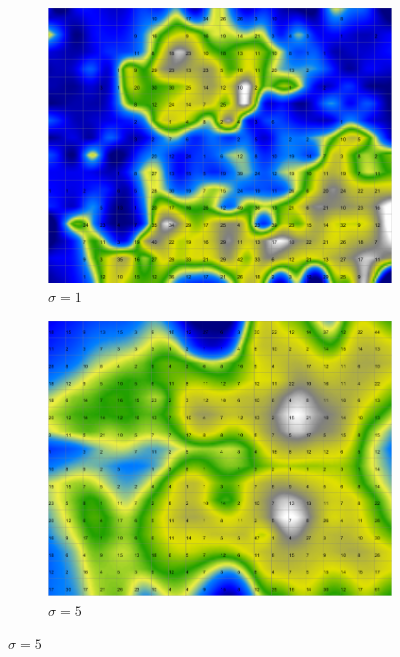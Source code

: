 \documentclass{acm_proc_article-sp}
\begin{document}
\begin{figure}
\centering
    \centering
    \begin{subfigure}[b]{0.30\linewidth}
        \includegraphics[width=\linewidth]{img/wine-newmid-smoothed-data-histogram-sigma-1}
        \caption{$\sigma=1$}
        \label{fig:wine-newmid-smoothed-data-histogram-sigma-1}
    \end{subfigure}
    \begin{subfigure}[b]{0.30\linewidth}
        \includegraphics[width=\linewidth]{img/wine-newmid-smoothed-data-histogram-sigma-5}
        \caption{$\sigma=5$}
        \label{fig:wine-newmid-smoothed-data-histogram-sigma-5}

\end{subfigure}
\end{figure}
\end{document}
